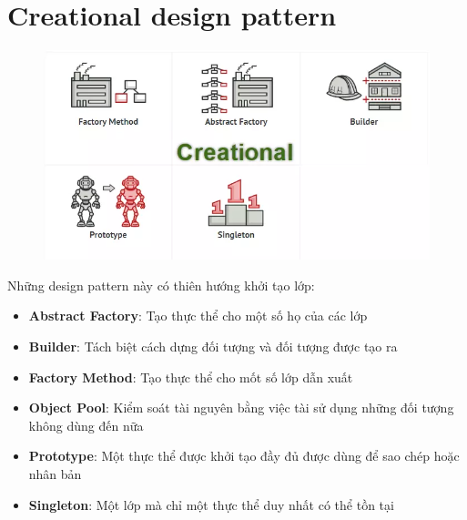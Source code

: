 \section{Creational design pattern}
\begin{figure}[!htb]
    \centering
    \includegraphics[width=\textwidth]{fig/Introduction/creational.png}
\end{figure}\newpage
Những design pattern này có thiên hướng khởi tạo lớp:
\begin{itemize}
    \item \textbf{Abstract Factory}: Tạo thực thể cho một số họ của các lớp
    \item \textbf{Builder}: Tách biệt cách dựng đối tượng và đối tượng được tạo ra
    \item \textbf{Factory Method}: Tạo thực thể cho mốt số lớp dẫn xuất
    \item \textbf{Object Pool}: Kiểm soát tài nguyên bằng việc tài sử dụng những đối tượng không dùng đến nữa
    \item \textbf{Prototype}: Một thực thể được khởi tạo đầy đủ được dùng để sao chép hoặc nhân bản
    \item \textbf{Singleton}: Một lớp mà chỉ một thực thể duy nhất có thể tồn tại
\end{itemize}

